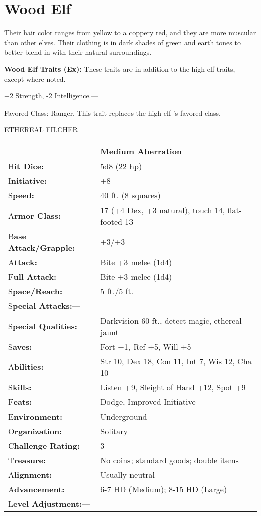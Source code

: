 \documentclass{article}
\begin{document}
\vspace{12pt}
\section*{\textbf{Wood Elf}}

Their hair color ranges from yellow to a coppery red, and they are more muscular 
than other elves. Their clothing is in dark shades of green and earth tones to 
better blend in with their natural surroundings.

\textbf{Wood Elf Traits (Ex):} These traits are in addition to the high elf traits, 
except where noted.--- 

\parindent=3pt
+2 Strength, -2 Intelligence.---

\parindent=0pt
Favored Class: Ranger. This trait replaces the high elf 's favored class.

\vspace{12pt}
{\LARGE{}ETHEREAL FILCHER}

\begin{tabular}{|>{\raggedright}p{91pt}|>{\raggedright}p{193pt}|}
\hline
  & Medium Aberration\tabularnewline
\hline
H\textbf{it Dice:} & 5d8 (22 hp)\tabularnewline
\hline
I\textbf{nitiative:} & +8\tabularnewline
\hline
S\textbf{peed:} & 40 ft. (8 squares)\tabularnewline
\hline
A\textbf{rmor Class:} & 17 (+4 Dex, +3 natural), touch 14, flat-footed 13\tabularnewline
\hline
B\textbf{ase Attack/Grapple:} & +3/+3\tabularnewline
\hline
A\textbf{ttack:} & Bite +3 melee (1d4)\tabularnewline
\hline
F\textbf{ull Attack:} & Bite +3 melee (1d4)\tabularnewline
\hline
S\textbf{pace/Reach:} & 5 ft./5 ft.\tabularnewline
\hline
S\textbf{pecial Attacks:}--- & \tabularnewline
\hline
S\textbf{pecial Qualities:} & Darkvision 60 ft., detect magic, ethereal jaunt\tabularnewline
\hline
S\textbf{aves:} & Fort +1, Ref +5, Will +5\tabularnewline
\hline
A\textbf{bilities:} & Str 10, Dex 18, Con 11, Int 7, Wis 12, Cha 10\tabularnewline
\hline
S\textbf{kills:} & Listen +9, Sleight of Hand +12, Spot +9\tabularnewline
\hline
F\textbf{eats:} & Dodge, Improved Initiative\tabularnewline
\hline
E\textbf{nvironment:} & Underground\tabularnewline
\hline
O\textbf{rganization:} & Solitary\tabularnewline
\hline
C\textbf{hallenge Rating:} & 3\tabularnewline
\hline
T\textbf{reasure:} & No coins; standard goods; double items\tabularnewline
\hline
A\textbf{lignment:} & Usually neutral\tabularnewline
\hline
A\textbf{dvancement:} & 6-7 HD (Medium); 8-15 HD (Large)\tabularnewline
\hline
L\textbf{evel Adjustment:}--- & \tabularnewline
\hline
\end{tabular}
\end{document}
